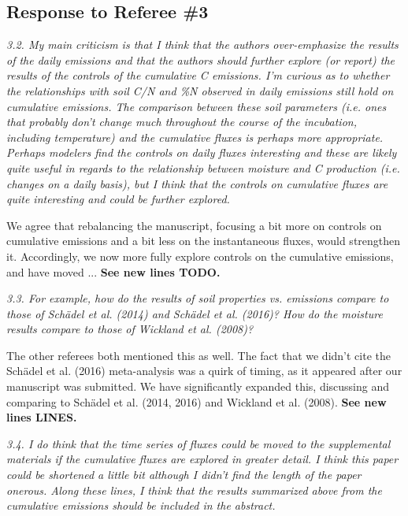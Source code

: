 \documentclass[11pt, oneside]{article}
\begin{document}
\newpage
\subsection*{Response to Referee \#3}

{\it 3.2. My main criticism is that I think that the authors over-emphasize the results of the daily emissions and that the authors should further explore (or report) the results of the controls of the cumulative C emissions. I'm curious as to whether the relationships with soil C/N and \%N observed in daily emissions still hold on cumulative emissions. The comparison between these soil parameters (i.e. ones that probably don't change much throughout the course of the incubation, including temperature) and the cumulative fluxes is perhaps more appropriate. Perhaps modelers find the controls on daily fluxes interesting and these are likely quite useful in regards to the relationship between moisture and C production (i.e. changes on a daily basis), but I think that the controls on cumulative fluxes are quite interesting and could be further explored. }

We agree that rebalancing the manuscript, focusing a bit more on controls on cumulative emissions and a bit less on the instantaneous fluxes, would strengthen it. Accordingly, we now more fully explore controls on the cumulative emissions, and have moved ... {\bf See new lines TODO.}

\medskip
{\it 3.3. For example, how do the results of soil properties vs. emissions compare to those of Schädel et al. (2014) and Schädel et al. (2016)? How do the moisture results compare to those of Wickland et al. (2008)? }

The other referees both mentioned this as well. The fact that we didn't cite the Schädel et al. (2016) meta-analysis was a quirk of timing, as it appeared after our manuscript was submitted. We have significantly expanded this, discussing and comparing to Schädel et al. (2014, 2016) and Wickland et al. (2008). {\bf See new lines LINES.}

\medskip
{\it 3.4. I do think that the time series of fluxes could be moved to the supplemental materials if the cumulative fluxes are explored in greater detail. I think this paper could be shortened a little bit although I didn't find the length of the paper onerous. Along these lines, I think that the results summarized above from the cumulative emissions should be included in the abstract. }
\end{document}
